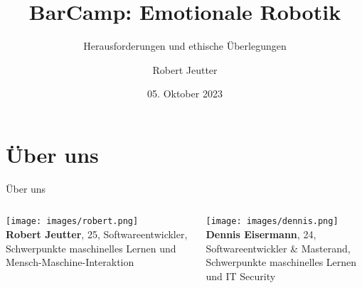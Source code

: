 \documentclass[aspectratio=169]{beamer}
\title{BarCamp: Emotionale Robotik}
\subtitle{Herausforderungen und ethische Überlegungen}
\author{Robert Jeutter}
\date{05. Oktober 2023}
\begin{document}
\maketitle

\section{Über uns}
\begin{frame}{Über uns}
  \begin{columns}
    \begin{column}{0.4\textwidth}
      \texttt{[image: images/robert.png]}\\
      \textbf{Robert Jeutter}, 25, \arabar{}
      Softwareentwickler,\\
      \scriptsize{Schwerpunkte maschinelles Lernen und Mensch-Maschine-Interaktion}
    \end{column}
    \begin{column}{0.4\textwidth}
      \texttt{[image: images/dennis.png]}\\
      \textbf{Dennis Eisermann}, 24, \arabar{}
      Softwareentwickler \& Masterand,\\
      \scriptsize{Schwerpunkte maschinelles Lernen und IT Security}
    \end{column}
  \end{columns}
\end{frame}
\end{document}
